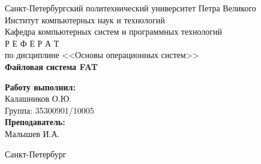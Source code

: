 \begin{titlepage}
    \begin{center}
        \large Санкт-Петербургский политехнический университет Петра Великого\\
        \large Институт компьютерных наук и технологий \\
        \large Кафедра компьютерных систем и программных технологий\\[6cm]


        \huge Р Е Ф Е Р А Т\\[0.5cm]
        \large по дисциплине <<Основы операционных систем>>\\[0.1cm]
        \large\textbf{Файловая система FAT}\\[5cm]
    \end{center}


    \begin{flushright}
        \begin{minipage}{0.25\textwidth}
            \begin{flushleft}

                \large\textbf{Работу выполнил:}\\
                \large Калашников О.Ю.\\
                \large {Группа:} 35300901/10005\\

                \large \textbf{Преподаватель:}\\
                \large Малышев И.А.

            \end{flushleft}
        \end{minipage}
    \end{flushright}

    \vfill

    \begin{center}
        \large Санкт-Петербург\\
        \large \the\year
    \end{center}
\end{titlepage}

\vfill
\newpage